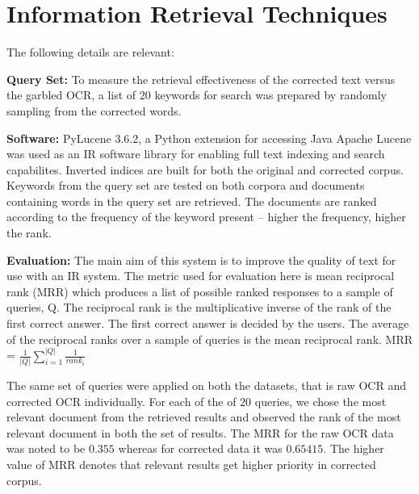 \documentclass{sig-alternate}
\begin{document}
\section{Information Retrieval Techniques}
\label{ir}
The following details are relevant: 

\noindent \textbf{Query Set:} To measure the retrieval effectiveness of the corrected text versus the garbled OCR, a list of 20 keywords for search was prepared by randomly sampling from the corrected words.

\noindent \textbf{Software:} PyLucene 3.6.2, a Python extension for accessing Java Apache Lucene was used as an IR software library for enabling full text indexing and search capabilites. Inverted indices are built for both the original and corrected corpus. Keywords from the query set are tested on both corpora and documents containing words in the query set are retrieved. The documents are ranked according to the frequency of the keyword present -- higher the frequency, higher the rank.

\noindent \textbf{Evaluation:} The main aim of this system is to improve the quality of text for use with an IR system. The metric used for evaluation here is mean reciprocal rank (MRR) which produces a list of possible ranked responses to a sample of queries, Q. The reciprocal rank is the multiplicative inverse of the rank of the first correct answer. The first correct answer is decided by the users. The average of the reciprocal ranks over a sample of queries is the mean reciprocal rank.
MRR = $\frac{1}{|Q|} \sum_{i = 1}^{|Q|} \frac{1}{rank_{i}}$

The same set of queries were applied on both the datasets, that is raw OCR and corrected OCR individually. For each of the of $20$ queries, we chose the most relevant document from the retrieved results and observed the rank of the most relevant document in both the set of results. The MRR for the raw OCR data was noted to be $0.355$ whereas for corrected data it was $0.65415$. The higher value of MRR denotes that relevant results get higher priority in corrected corpus.

 
\end{document}

